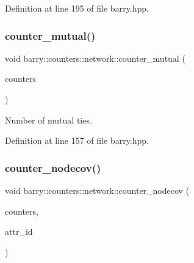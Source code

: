 Definition at line 195 of file barry.\+hpp.

\mbox{\label{namespacebarry_1_1counters_1_1network_a668c4f3b6abba62e113ae7e382d4b63a}} 
\subsubsection{\texorpdfstring{counter\+\_\+mutual()}{counter\_mutual()}}
{\footnotesize\ttfamily void barry\+::counters\+::network\+::counter\+\_\+mutual (\begin{DoxyParamCaption}\item[{\hyperlink{namespacebarry_1_1counters_1_1network_aa72fdb34752ac24167a06ee196a8fff6}{Net\+Counters} $\ast$}]{counters }\end{DoxyParamCaption})\hspace{0.3cm}{\ttfamily [inline]}}



Number of mutual ties. 



Definition at line 157 of file barry.\+hpp.

\mbox{\label{namespacebarry_1_1counters_1_1network_a0f18e2af090591c3f47c95849ec324da}} 
\subsubsection{\texorpdfstring{counter\+\_\+nodecov()}{counter\_nodecov()}}
{\footnotesize\ttfamily void barry\+::counters\+::network\+::counter\+\_\+nodecov (\begin{DoxyParamCaption}\item[{\hyperlink{namespacebarry_1_1counters_1_1network_aa72fdb34752ac24167a06ee196a8fff6}{Net\+Counters} $\ast$}]{counters,  }\item[{\hyperlink{namespacebarry_a11dfc53ddb4672278319aa04f1e09a6c}{uint}}]{attr\+\_\+id }\end{DoxyParamCaption})\hspace{0.3cm}{\ttfamily [inline]}}



